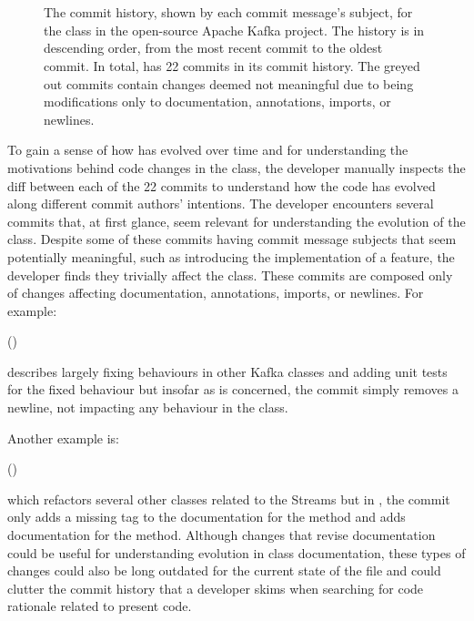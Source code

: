\begin{figure}
\begin{mdframed}
\begin{RaggedRight}
		\textcolor{gray}{} \\
		 \\
	\end{RaggedRight}
	\end{mdframed}
	\caption{The commit history, shown by each commit message's subject, for the  class in the open-source Apache Kafka project. 
		The history is in descending order, from the most recent commit to the oldest commit.
		In total,  has 22 commits in its commit history. The greyed out commits contain changes deemed not meaningful due to being modifications only to documentation, annotations, imports, or newlines.
	}
	\label{fig:Topology-Commit-History}
\end{figure}

To gain a sense of how  has evolved over time 
and for understanding the motivations behind code changes in the class, 
the developer manually inspects the diff between each of the 22 commits to understand 
how the code has evolved along different commit authors' intentions.
The developer encounters several commits that, at first glance, 
seem relevant for understanding the evolution of the  class.
Despite some of these commits having commit message subjects that seem potentially 
meaningful, such as introducing the implementation of a feature, 
the developer finds they trivially affect the  class.
These commits are composed only of changes affecting documentation, annotations, imports, or newlines.
For example: 

\begin{center}
	 ()
\end{center}

\noindent describes largely fixing behaviours in other Kafka classes and adding unit tests for the fixed behaviour 
but insofar as  is concerned, the commit simply removes a newline, not impacting any behaviour in the class.

Another example is: 

\begin{center}
	 ()
\end{center}

\noindent which refactors several other classes related to the Streams  
but in , the commit only adds a missing  tag 
to the documentation for the  method 
and adds documentation for the  method.
Although changes that revise documentation could be useful for understanding evolution in class documentation, 
these types of changes could also be long outdated for the current state of the file 
and could clutter the commit history that a developer skims when searching for code rationale related to present code.

